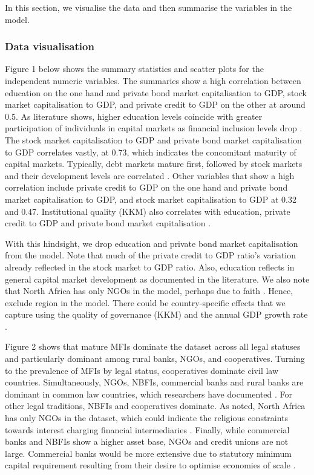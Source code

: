\documentclass[a4paper,nobind]{templates/ociamthesis}
\begin{document}
In this section, we visualise the data and then summarise the variables in the model.

\hypertarget{data-visualisation}{%
\subsubsection{Data visualisation}\label{data-visualisation}}

Figure 1 below shows the summary statistics and scatter plots for the independent numeric variables. The summaries show a high correlation between education on the one hand and private bond market capitalisation to GDP, stock market capitalisation to GDP, and private credit to GDP on the other at around 0.5. As literature shows, higher education levels coincide with greater participation of individuals in capital markets as financial inclusion levels drop \autocite{allen2013resolving,allen2014african}. The stock market capitalisation to GDP and private bond market capitalisation to GDP correlates vastly, at 0.73, which indicates the concomitant maturity of capital markets. Typically, debt markets mature first, followed by stock markets and their development levels are correlated \autocite{levine1999stock}. Other variables that show a high correlation include private credit to GDP on the one hand and private bond market capitalisation to GDP, and stock market capitalisation to GDP at 0.32 and 0.47. Institutional quality (KKM) also correlates with education, private credit to GDP and private bond market capitalisation \autocite{yartey2008determinants}.

With this hindsight, we drop education and private bond market capitalisation from the model. Note that much of the private credit to GDP ratio's variation already reflected in the stock market to GDP ratio. Also, education reflects in general capital market development as documented in the literature. We also note that North Africa has only NGOs in the model, perhaps due to faith \autocite{allen2013resolving,allen2014african,hassan2018religious}. Hence, exclude region in the model. There could be country-specific effects that we capture using the quality of governance (KKM) \autocite{kunvcivc2014institutional} and the annual GDP growth rate \autocite{butkiewicz2006institutional}.

Figure 2 shows that mature MFIs dominate the dataset across all legal statuses and particularly dominant among rural banks, NGOs, and cooperatives. Turning to the prevalence of MFIs by legal status, cooperatives dominate civil law countries. Simultaneously, NGOs, NBFIs, commercial banks and rural banks are dominant in common law countries, which researchers have documented \autocite{pashkova2016business}. For other legal traditions, NBFIs and cooperatives dominate. As noted, North Africa has only NGOs in the dataset, which could indicate the religious constraints towards interest charging financial intermediaries \autocite{hassan2018religious}. Finally, while commercial banks and NBFIs show a higher asset base, NGOs and credit unions are not large. Commercial banks would be more extensive due to statutory minimum capital requirement resulting from their desire to optimise economies of scale \autocite{aiyar2016does}.
\end{document}
